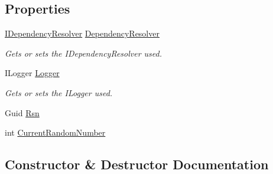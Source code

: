 \subsection*{Properties}
\begin{DoxyCompactItemize}
\item 
\hyperlink{interfaceCqrs_1_1Configuration_1_1IDependencyResolver}{I\+Dependency\+Resolver} \hyperlink{classCqrs_1_1Tests_1_1Integrations_1_1SnapshotTests_1_1TestAggregate_a1478ed948e9e12631f24e078f20127c0_a1478ed948e9e12631f24e078f20127c0}{Dependency\+Resolver}
\begin{DoxyCompactList}\small\item\em Gets or sets the I\+Dependency\+Resolver used. \end{DoxyCompactList}\item 
I\+Logger \hyperlink{classCqrs_1_1Tests_1_1Integrations_1_1SnapshotTests_1_1TestAggregate_aa914e033ac0feca1d06e870a9c124ef5_aa914e033ac0feca1d06e870a9c124ef5}{Logger}
\begin{DoxyCompactList}\small\item\em Gets or sets the I\+Logger used. \end{DoxyCompactList}\item 
Guid \hyperlink{classCqrs_1_1Tests_1_1Integrations_1_1SnapshotTests_1_1TestAggregate_a66fb957e1533cd2fb848c8660e682a22_a66fb957e1533cd2fb848c8660e682a22}{Rsn}
\item 
int \hyperlink{classCqrs_1_1Tests_1_1Integrations_1_1SnapshotTests_1_1TestAggregate_a6098f243653763f7bac837e3ef96f2f8_a6098f243653763f7bac837e3ef96f2f8}{Current\+Random\+Number}
\end{DoxyCompactItemize}


\subsection{Constructor \& Destructor Documentation}
\mbox{\label{classCqrs_1_1Tests_1_1Integrations_1_1SnapshotTests_1_1TestAggregate_a7ce466d762d07050e09c5361b9409172_a7ce466d762d07050e09c5361b9409172}} 
